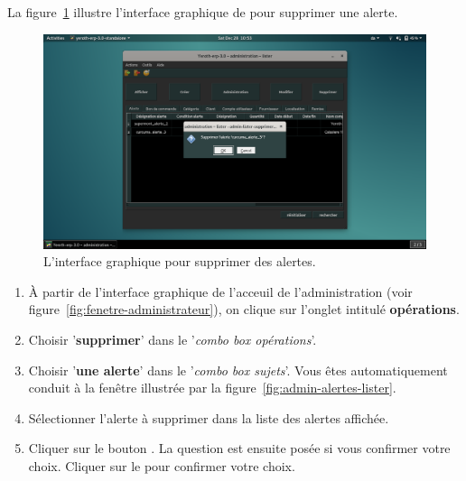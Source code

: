 
\newpage
{}

La figure~\ref{fig:admin-alertes-supprimer} illustre l'interface
graphique de \yeroth pour supprimer une alerte.\\

\begin{figure}[!htpb]
	\centering
	\includegraphics[scale=0.35]{images/alerte-supprimer.png}
	\caption{L'interface graphique pour supprimer des alertes.}
	\label{fig:admin-alertes-supprimer}
\end{figure}

\begin{enumerate}[1)]
	\item \`A partir de l'interface graphique de l'acceuil de
		l'administration (voir figure~\ref{fig:fenetre-administrateur}),
		on clique sur l'onglet intitul\'e \textbf{op\'erations}. 
		
	\item Choisir '\textbf{supprimer}' dans le '\emph{combo box
		op\'erations}'.
		
	\item Choisir '\textbf{une alerte}' dans le '\emph{combo box
		sujets}'. Vous \^etes automatiquement conduit \`a la fen\^etre
		illustr\'ee par la figure~\ref{fig:admin-alertes-lister}.
		
	\item S\'electionner l'alerte \`a supprimer dans la liste
		des alertes affich\'ee.
		
	\item Cliquer sur le bouton . La question
		est ensuite pos\'ee si vous confirmer votre choix.
		Cliquer sur le  pour confirmer votre choix.
\end{enumerate}
